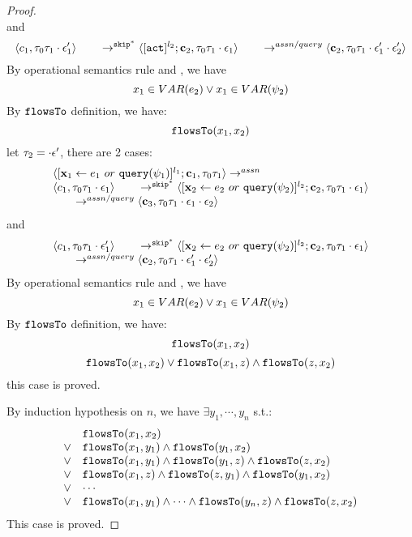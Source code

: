 \documentclass[a4paper,11pt]{article}
\begin{document}
\begin{proof}
\[\]
and
\[
	 \langle c_1, \mathtt{\tau}_0 \mathtt{\tau}_1 \cdot \mathtt{\epsilon}_1' \rangle 
  \qquad \rightarrow^{\mathtt{skip}^*} 
  \langle [\mathtt{act}]^{l_2} ; {\boldsymbol{\mathbf{c}}}_2, \mathtt{\tau}_0 \mathtt{\tau}_1 \cdot \mathtt{\epsilon}_1 \rangle 
  \\
  \qquad \rightarrow^{assn/query} 
  \langle {\boldsymbol{\mathbf{c}}}_2,  \mathtt{\tau}_0 \mathtt{\tau}_1 \cdot \mathtt{\epsilon}_1' \cdot \mathtt{\epsilon}_2' \rangle 
\]
By operational semantics rule  and , we have 
\[
	x_1 \in VAR(e_2) \lor x_1 \in VAR(\psi_2)
\]
By $\mathtt{flowsTo}$ definition, we have:
\[
\mathtt{flowsTo}(x_1, x_2)
\]
%
 let $\mathtt{\tau}_2 = \cdot \mathtt{\epsilon}'$, there are 2 cases:
\[
\begin{array}{l}
	\langle [\mathrel{ {\boldsymbol{\mathbf{x}}}_1 \leftarrow e_1~ or ~ {\tt query}(\psi_1) }]^{l_1} ; {\boldsymbol{\mathbf{c}}}_1, \mathtt{\tau}_0 \mathtt{\tau}_1 \rangle  \rightarrow^{assn}
\\ 
 \langle c_1, \mathtt{\tau}_0 \mathtt{\tau}_1 \cdot \mathtt{\epsilon}_1 \rangle 
  \qquad \rightarrow^{\mathtt{skip}^*} 
  \langle [\mathrel{ {\boldsymbol{\mathbf{x}}}_2 \leftarrow e_2 ~ or ~ {\tt query}(\psi_2) }]^{l_2};{\boldsymbol{\mathbf{c}}}_2, 
  \mathtt{\tau}_0 \mathtt{\tau}_1 \cdot \mathtt{\epsilon}_1 \rangle 
  \\
  \qquad \rightarrow^{assn/query} 
  \langle {\boldsymbol{\mathbf{c}}}_3,  \mathtt{\tau}_0 \mathtt{\tau}_1 \cdot \mathtt{\epsilon}_1\cdot \mathtt{\epsilon}_2 \rangle 
\end{array}
\]
and
\[
\begin{array}{l}
\langle c_1, \mathtt{\tau}_0 \mathtt{\tau}_1 \cdot \mathtt{\epsilon}_1' \rangle 
  \qquad \rightarrow^{\mathtt{skip}^*} 
  \langle [\mathrel{ {\boldsymbol{\mathbf{x}}}_2 \leftarrow e_2 ~ or ~ {\tt query}(\psi_2) }]^{l_2} ; {\boldsymbol{\mathbf{c}}}_2, \mathtt{\tau}_0 \mathtt{\tau}_1 \cdot \mathtt{\epsilon}_1 \rangle 
  \\
  \qquad \rightarrow^{assn/query} 
  \langle {\boldsymbol{\mathbf{c}}}_2,  \mathtt{\tau}_0 \mathtt{\tau}_1 \cdot \mathtt{\epsilon}_1' \cdot \mathtt{\epsilon}_2' \rangle
\end{array} 
\]
By operational semantics rule  and , we have 
\[
	x_1 \in VAR(e_2) \lor x_1 \in VAR(\psi_2)
\]
By $\mathtt{flowsTo}$ definition, we have:
\[
\mathtt{flowsTo}(x_1, x_2)
\]
\[
	\mathtt{flowsTo}(x_1, x_2) \lor \mathtt{flowsTo}(x_1, z) \land \mathtt{flowsTo}(z, x_2)
\]
this case is proved.

By induction hypothesis on $n$, we have $\exists y_1, \cdots, y_n$ s.t.:
\[
\begin{array}{ll}
			& \mathtt{flowsTo}(x_1, x_2) \\
	\lor 	& \mathtt{flowsTo}(x_1, y_1) \land \mathtt{flowsTo}(y_1, x_2)\\
	\lor 	& \mathtt{flowsTo}(x_1, y_1) \land \mathtt{flowsTo}(y_1, z) \land \mathtt{flowsTo}(z, x_2) \\
	\lor 	& \mathtt{flowsTo}(x_1, z) \land \mathtt{flowsTo}(z, y_1) \land \mathtt{flowsTo}(y_1, x_2) \\
	\lor 	& \cdots \\
	\lor 	& \mathtt{flowsTo}(x_1, y_1) \land \cdots \land \mathtt{flowsTo}(y_n, z) \land \mathtt{flowsTo}(z, x_2) \\
\end{array}
\]
This case is proved.


\end{proof}
\end{document}
